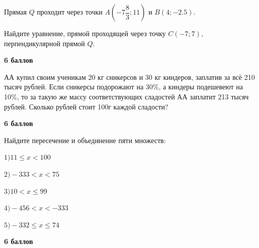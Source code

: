  Прямая $Q$ проходит через точки $A(-7\dfrac{8}{3};11)$ и $B(4;-2.5)$.

Найдите уравнение, прямой проходящей через точку $C(-7;7)$, перпендикулярной прямой $Q$.

\hspace{3mm}

\begin{flushright} \textbf{6 баллов}\\ 
\end{flushright}

\hspace{3mm}

 АА купил своим ученикам 20 кг сникерсов и 30 кг киндеров, заплатив за всё 210 тысяч рублей. Если сникерсы подорожают на 30\%, а киндеры подешевеют на 10\%, то за такую же массу соответствующих сладостей АА заплатит 213 тысяч рублей. Сколько рублей стоит 100г каждой сладости?


\begin{flushright} \textbf{6 баллов}\\ 
\end{flushright}

\hspace{3mm}

\hspace{3mm}

 Найдите пересечение и объединение пяти множеств:

\begin{flushleft}
  $1) 11 \leqslant x   < 100$
\end{flushleft}

\begin{flushleft}
  $2) -333 < x  < 75$
\end{flushleft}

\begin{flushleft}
  $3) 10 < x  \leqslant 99$
\end{flushleft}

\begin{flushleft}
  $4) -456 < x  < -333$
\end{flushleft}

\begin{flushleft}
  $5) -332 \leqslant x  \leqslant 74$
\end{flushleft}

\begin{flushright} \textbf{6 баллов}\\ 
\end{flushright}

